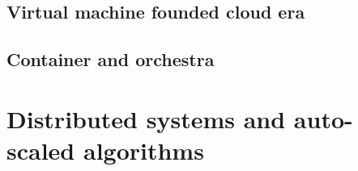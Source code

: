 \subsection{Virtual machine founded cloud era}

\subsection{Container and orchestra}

\section{Distributed systems and auto-scaled algorithms}

